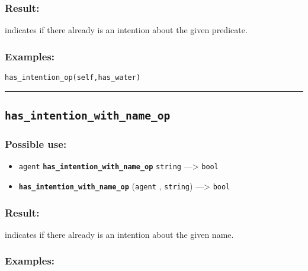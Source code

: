 \documentclass[]{book}
\providecommand{\tightlist}{%
  \setlength{\itemsep}{0pt}\setlength{\parskip}{0pt}}
\theoremstyle{definition}
\theoremstyle{definition}
\theoremstyle{definition}
\theoremstyle{remark}
\begin{document}
\subsubsection{Result:}\label{result-243}

indicates if there already is an intention about the given predicate.

\subsubsection{Examples:}\label{examples-192}

\begin{verbatim}
has_intention_op(self,has_water) 
\end{verbatim}

\begin{center}\rule{0.5\linewidth}{\linethickness}\end{center}

\subsection{\texorpdfstring{\texttt{has\_intention\_with\_name\_op}}{has\_intention\_with\_name\_op}}\label{has_intention_with_name_op}

\subsubsection{Possible use:}\label{possible-use-253}

\begin{itemize}
\tightlist
\item
  \texttt{agent} \textbf{\texttt{has\_intention\_with\_name\_op}}
  \texttt{string} ---\textgreater{} \texttt{bool}
\item
  \textbf{\texttt{has\_intention\_with\_name\_op}} (\texttt{agent} ,
  \texttt{string}) ---\textgreater{} \texttt{bool}
\end{itemize}

\subsubsection{Result:}\label{result-244}

indicates if there already is an intention about the given name.

\subsubsection{Examples:}\label{examples-193}
\end{document}
